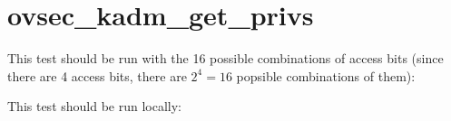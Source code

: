 


\section{ovsec_kadm_get_privs}


This test should be run with the 16 possible combinations of access
bits (since there are 4 access bits, there are $2^4 = 16$ popsible
combinations of them):


This test should be run locally:



